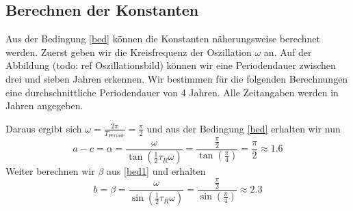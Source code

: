 \subsection{Berechnen der Konstanten}
Aus der Bedingung \ref{bed} können die Konstanten näherungsweise berechnet werden.
Zuerst geben wir die Kreisfrequenz der Oszillation $\omega$ an. 
Auf der Abbildung (todo: ref Oszillationsbild) können wir eine Periodendauer zwischen drei und sieben Jahren erkennen.
Wir bestimmen für die folgenden Berechnungen eine durchschnittliche Periodendauer von 4 Jahren. 
Alle Zeitangaben werden in Jahren angegeben.

Daraus ergibt sich $\omega = \frac{2\pi}{T_{Periode}} = \frac{\pi}{2}$ und aus der Bedingung \ref{bed} erhalten wir nun 
\begin{equation}
	a-c=\alpha=\frac{\omega}{\tan(\frac{1}{2}\tau_R \omega)}=\frac{\frac{\pi}{2}}{\tan(\frac{\pi}{4})}=\frac{\pi}{2}\approx 1.6
\end{equation}
Weiter berechnen wir $\beta$ aus \ref{bed1} und erhalten
\begin{equation}
	b=\beta=\frac{\omega}{\sin(\frac{1}{2}\tau_R \omega)}=\frac{\frac{\pi}{2}}{\sin(\frac{\pi}{4})}\approx 2.3
\end{equation}

